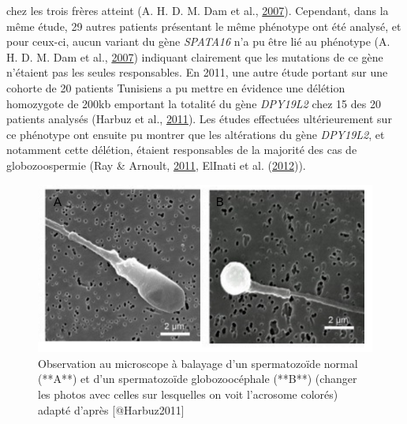 \documentclass[12pt,twoside]{reedthesis}
\theoremstyle{definition}
\theoremstyle{definition}
\theoremstyle{remark}
\begin{document}
  chez les trois frères atteint (A. H. D. M. Dam et al.,
  \protect\hyperlink{ref-Dam2007}{2007}). Cependant, dans la même étude,
  29 autres patients présentant le même phénotype ont été analysé, et pour
  ceux-ci, aucun variant du gène \emph{SPATA16} n'a pu être lié au
  phénotype (A. H. D. M. Dam et al.,
  \protect\hyperlink{ref-Dam2007}{2007}) indiquant clairement que les
  mutations de ce gène n'étaient pas les seules responsables. En 2011, une
  autre étude portant sur une cohorte de 20 patients Tunisiens a pu mettre
  en évidence une délétion homozygote de 200kb emportant la totalité du
  gène \emph{DPY19L2} chez 15 des 20 patients analysés (Harbuz et al.,
  \protect\hyperlink{ref-Harbuz2011}{2011}). Les études effectuées
  ultérieurement sur ce phénotype ont ensuite pu montrer que les
  altérations du gène \emph{DPY19L2}, et notamment cette délétion, étaient
  responsables de la majorité des cas de globozoospermie (Ray \& Arnoult,
  \protect\hyperlink{ref-Ray2011}{2011}, ElInati et al.
  (\protect\hyperlink{ref-ElInati2012}{2012})).
  
  \begin{figure}
  
  {\centering \includegraphics[scale=0.50]{figure/globo_normal_spz} 
  
  }
  
  \caption[Observation au microscope à balayage d'un spermatozoïde normal (**A**) et d'un spermatozoïde globozoocéphale (**B**) (changer les photos avec celles sur lesquelles on voit l'acrosome colorés)]{Observation au microscope à balayage d'un spermatozoïde normal (**A**) et d'un spermatozoïde globozoocéphale (**B**) (changer les photos avec celles sur lesquelles on voit l'acrosome colorés) adapté d'après [@Harbuz2011]}\label{fig:globospz}
  \end{figure}
  
\end{document}
